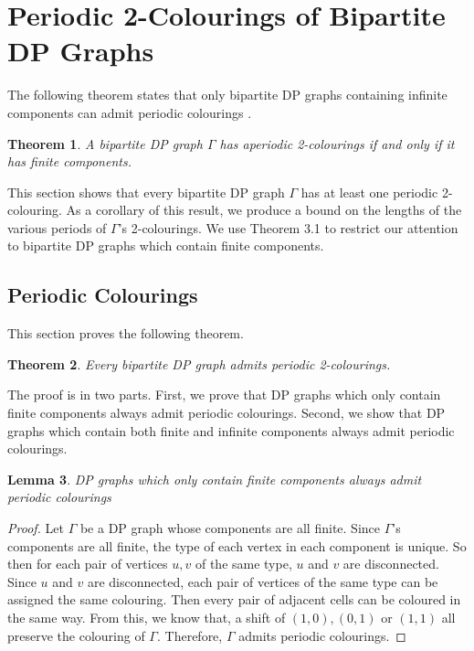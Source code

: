 \documentclass[letterpaper]{article}
\newtheorem{theorem}{Theorem}[section]
\newtheorem{lemma}[theorem]{Lemma}
\begin{document}

\section{Periodic 2-Colourings of Bipartite DP Graphs}

The following theorem states that only bipartite DP graphs containing infinite components can admit periodic colourings \cite{beth10}.

\begin{theorem} \cite{beth10}
A bipartite DP graph $\Gamma$ has aperiodic 2-colourings if and only if it has finite components.
\end{theorem}

This section shows that every bipartite DP graph $\Gamma$ has at least one periodic 2-colouring.
As a corollary of this result, we produce a bound on the lengths of the various periods of $\Gamma$'s 2-colourings.
We use Theorem 3.1 to restrict our attention to bipartite DP graphs which contain finite components.


\subsection{Periodic Colourings}

This section proves the following theorem.

\begin{theorem}
Every bipartite DP graph admits periodic 2-colourings.
\end{theorem}

The proof is in two parts.
First, we prove that DP graphs which only contain finite components always admit periodic colourings.
Second, we show that DP graphs which contain both finite and infinite components always admit periodic colourings.

\begin{lemma}
DP graphs which only contain finite components always admit periodic colourings
\end{lemma}

\begin{proof}
Let $\Gamma$ be a DP graph whose components are all finite.
Since $\Gamma$'s components are all finite, the type of each vertex in each component is unique.
So then for each pair of vertices $u,v$ of the same type, $u$ and $v$ are disconnected.
Since $u$ and $v$ are disconnected, each pair of vertices of the same type can be assigned the same colouring.
Then every pair of adjacent cells can be coloured in the same way.
From this, we know that, a shift of $(1,0), (0,1)$ or $(1,1)$ all preserve the colouring of $\Gamma$.
Therefore, $\Gamma$ admits periodic colourings.
\end{proof}
\end{document}
